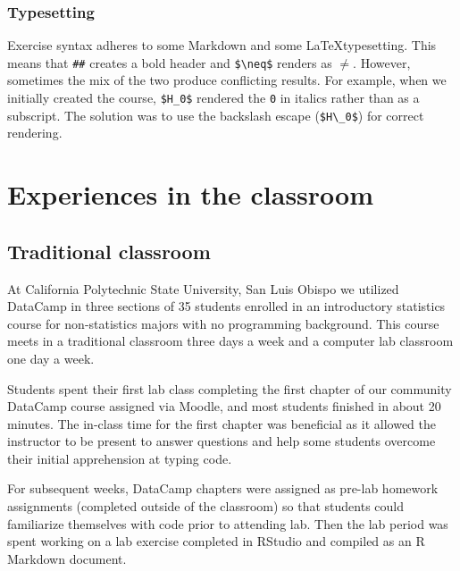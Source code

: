 \documentclass{tise_style_doi}
\begin{document}
\subsubsection{Typesetting}

Exercise syntax adheres to some Markdown and some \LaTeX typesetting.  This means that
\texttt{\#\#} creates a bold header and \verb|$\neq$| renders as \texttt{$\neq$}. However,
sometimes the mix of the two produce conflicting results.  For example, when we initially
created the course, \verb|$H_0$| rendered the \texttt{0} in italics rather than as
a subscript.  The solution was to use the backslash escape (\verb|$H\_0$|) for
correct rendering.



\section{Experiences in the classroom}

\subsection{Traditional classroom}

At California Polytechnic State University, San Luis Obispo we utilized DataCamp
in three sections of 35 students enrolled in an introductory statistics course
for non-statistics majors with no programming background. This course meets in a
traditional classroom three days a week and a computer lab classroom one day a week.

Students spent their first lab class completing the first chapter of our community
DataCamp course assigned via Moodle, and most students finished in about 20 minutes.
The in-class time for the first chapter was beneficial as it allowed the instructor
to be present to answer questions and help some students overcome their initial
apprehension at typing code.

For subsequent weeks, DataCamp chapters were assigned as pre-lab homework assignments
(completed outside of the classroom) so that students could familiarize themselves with
code prior to attending lab.  Then the lab period was spent working on a lab exercise
completed in RStudio and compiled as an R Markdown document.
\end{document}
